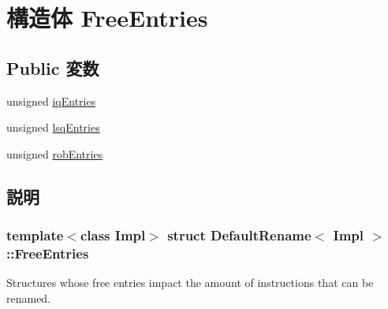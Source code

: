 \hypertarget{structDefaultRename_1_1FreeEntries}{
\section{構造体 FreeEntries}
\label{structDefaultRename_1_1FreeEntries}
}
\subsection*{Public 変数}
\begin{DoxyCompactItemize}
\item 
unsigned \hyperlink{structDefaultRename_1_1FreeEntries_ad0ea8223895ed6e0525ab5d0ecbc1baf}{iqEntries}
\item 
unsigned \hyperlink{structDefaultRename_1_1FreeEntries_a0251753eeeeffa9ebc3c69909dc95dc2}{lsqEntries}
\item 
unsigned \hyperlink{structDefaultRename_1_1FreeEntries_a4abcd7f900b12d143638dc56a18dd81b}{robEntries}
\end{DoxyCompactItemize}


\subsection{説明}
\subsubsection*{template$<$class Impl$>$ struct DefaultRename$<$ Impl $>$::FreeEntries}

Structures whose free entries impact the amount of instructions that can be renamed. 

